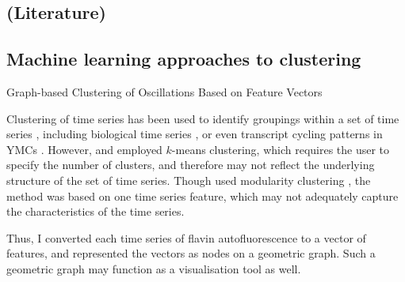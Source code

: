 \subsection{(Literature)}
\label{subsec:analysis-clustering-literature}

\subsection{Machine learning approaches to clustering}
\label{subsec:analysis-clustering-ml}

Graph-based Clustering of Oscillations Based on Feature Vectors

Clustering of time series has been used to identify groupings within a set of time series \citep{wangStructureBasedStatisticalFeatures2007}, including biological time series \citep{shafieiDopamineSignalingModulates2019}, or even transcript cycling patterns in YMCs \citep{tuLogicYeastMetabolic2005}.
However, \citet{wangStructureBasedStatisticalFeatures2007} and \citet{tuLogicYeastMetabolic2005} employed $k$-means clustering, which requires the user to specify the number of clusters, and therefore may not reflect the underlying structure of the set of time series.
Though \citet{shafieiDopamineSignalingModulates2019} used modularity clustering \citep{newmanModularityCommunityStructure2006}, the method was based on one time series feature, which may not adequately capture the characteristics of the time series.

Thus, I converted each time series of flavin autofluorescence to a vector of features, and represented the vectors as nodes on a geometric graph.
Such a geometric graph may function as a visualisation tool as well.



